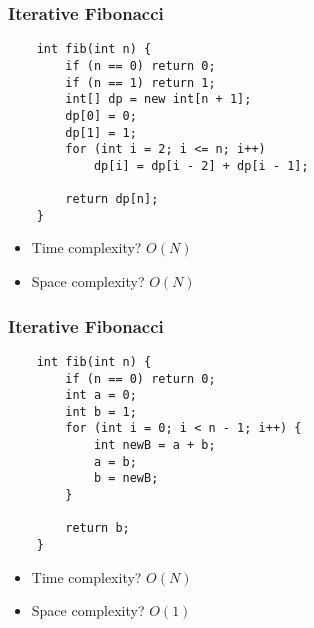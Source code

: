 \documentclass[t]{beamer}
\begin{document}
\begin{frame}[fragile]

    \frametitle{Iterative Fibonacci}
    
    \begin{verbatim}
    int fib(int n) {
        if (n == 0) return 0;
        if (n == 1) return 1;
        int[] dp = new int[n + 1];
        dp[0] = 0;
        dp[1] = 1;
        for (int i = 2; i <= n; i++)
            dp[i] = dp[i - 2] + dp[i - 1];

        return dp[n];
    }
    \end{verbatim}

    \pause

    \begin{itemize}

        \item

        Time complexity? \pause $O(N)$ \pause

        \item

        Space complexity? \pause $O(N)$

    \end{itemize}

\end{frame}

\begin{frame}[fragile]

    \frametitle{Iterative Fibonacci}
    
    \begin{verbatim}
    int fib(int n) {
        if (n == 0) return 0;
        int a = 0;
        int b = 1;
        for (int i = 0; i < n - 1; i++) {
            int newB = a + b;
            a = b;
            b = newB;
        }

        return b;
    }
    \end{verbatim}

    \begin{itemize}

        \item

        Time complexity? $O(N)$

        \item

        Space complexity? $O(1)$

    \end{itemize}

\end{frame}
\end{document}
